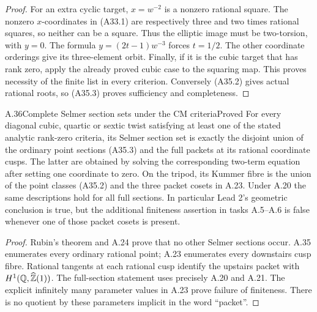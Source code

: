 \begin{proof}
For an extra cyclic target, $x=w^{-2}$ is a nonzero rational square.
The nonzero $x$-coordinates in (A33.1) are respectively three and two
times rational squares, so neither can be a square. Thus the elliptic
image must be two-torsion, with $y=0$. The formula $y=(2t-1)w^{-3}$
forces $t=1/2$. The other coordinate orderings give its three-element
orbit. Finally, if it is the cubic target that has rank zero, apply
the already proved cubic case to the squaring map. This proves necessity
of the finite list in every criterion. Conversely (A35.2) gives actual
rational roots, so (A35.3) proves sufficiency and completeness.
\end{proof}

\begin{statement}{A.36}{Complete Selmer section sets under the CM criteria}{Proved}
For every diagonal cubic, quartic or sextic twist satisfying at least
one of the stated analytic rank-zero criteria, its Selmer section set
is exactly the disjoint union of the ordinary point sections (A35.3)
and the full packets at its rational coordinate cusps. The latter are
obtained by solving the corresponding two-term equation after setting
one coordinate to zero. On the tripod, its Kummer fibre is the union
of the point classes (A35.2) and the three packet cosets in A.23.
Under A.20 the same descriptions hold for all full sections.
In particular Lead 2's geometric conclusion is true, but the additional
finiteness assertion in tasks A.5--A.6 is false whenever one of those
packet cosets is present.
\end{statement}
\begin{proof}
Rubin's theorem and A.24 prove that no other Selmer sections occur.
A.35 enumerates every ordinary rational point; A.23 enumerates every
downstairs cusp fibre. Rational tangents at each rational cusp identify
the upstairs packet with $H^1(\mathbb Q,\widehat{\mathbb Z}(1))$. The full-section statement
uses precisely A.20 and A.21. The explicit infinitely many parameter
values in A.23 prove failure of finiteness. There is no quotient by
these parameters implicit in the word ``packet''.
\end{proof}
